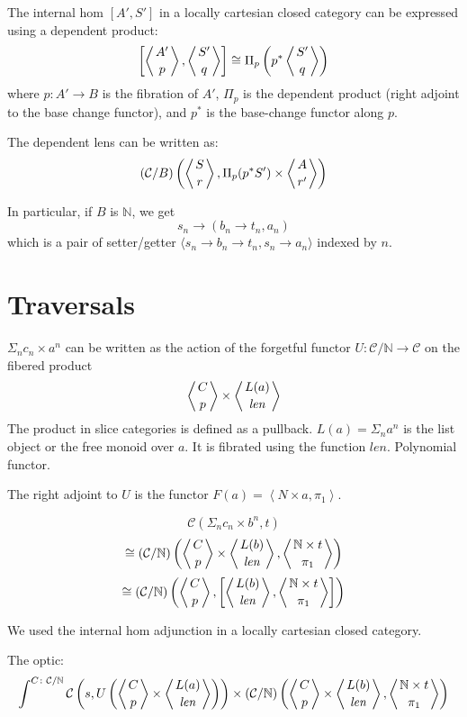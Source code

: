 \documentclass[11pt]{amsart}
\begin{document}
The internal hom $[A', S']$ in a locally cartesian closed category can be expressed using a dependent product:
\[ \left [\left \langle A' \atop p \right \rangle, \left \langle S' \atop q \right \rangle \right ] \cong \Pi_p \left(p^* \left \langle S' \atop q \right \rangle \right)\]
where $p \colon A' \to B$ is the fibration of $A'$, $\Pi_p$ is the dependent product (right adjoint to the base change functor), and $p^*$ is the base-change functor along $p$.

The dependent lens can be written as:
\[ (\mathcal{C} / B) \left( \left \langle S \atop r \right \rangle, \Pi_p (p^* S') \times \left \langle A \atop r' \right \rangle \right) \]

In particular, if $B$ is $\mathbb{N}$, we get
\[s_n \to (b_n \to t_n, a_n) \]
which is a pair of setter/getter $\langle s_n \to b_n \to t_n, s_n \to a_n \rangle$ indexed by $n$.

\section{Traversals}

$\Sigma_n c_n \times a^n$ can be written as the action of the forgetful functor $U \colon \mathcal{C}/\mathbb{N} \to \mathcal{C}$ on the fibered product
\[ \left \langle {C \atop p} \right \rangle \times \left \langle {L(a) \atop \mathit{len}} \right \rangle \]
The product in slice categories is defined as a pullback. $L(a) = \Sigma_n a^n$ is the list object or the free monoid over $a$. It is fibrated using the function $\mathit{len}$. Polynomial functor.

The right adjoint to $U$ is the functor $F(a) = \left \langle \mathit{N} \times a, \pi_1 \right \rangle$.


\[ \mathcal{C}(\Sigma_n c_n \times b^n, t) \]
\[ \cong  
(\mathcal{C}/\mathbb{N})\left(\left \langle {C \atop p} \right \rangle \times \left \langle {L(b) \atop \mathit{len}} \right \rangle, \left \langle {\mathbb{N} \times t \atop \pi_1} \right \rangle \right) \]
\[ \cong 
(\mathcal{C}/\mathbb{N})\left(\left \langle {C \atop p} \right \rangle, \left[ \left \langle {L(b) \atop \mathit{len}} \right \rangle, \left \langle {\mathbb{N} \times t \atop \pi_1} \right \rangle \right] \right) \]

We used the internal hom adjunction in a locally cartesian closed category.

The optic:
\[ \int^{C \colon \mathcal{C}/\mathbb{N}} \mathcal{C} 
\left(s, U\left( 
  \left \langle {C \atop p} \right \rangle \times \left \langle {L(a) \atop \mathit{len}} \right \rangle \right) \right)  
  \times (\mathcal{C}/\mathbb{N})\left( \left \langle {C \atop p} \right \rangle 
  \times \left \langle {L(b) \atop \mathit{len}} \right \rangle, \left \langle {\mathbb{N} \times t \atop \pi_1} \right \rangle \right) \]
  
\end{document}
